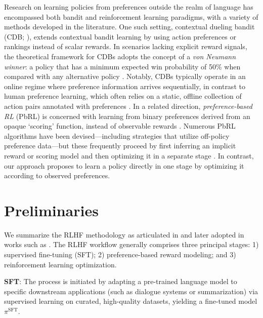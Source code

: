 Research on learning policies from preferences outside the realm of language has encompassed both bandit and reinforcement learning paradigms, with a variety of methods developed in the literature. One such setting, contextual dueling bandit (CDB; \cite{yue2012karmed,dudik2015contextual}), extends contextual bandit learning by using action preferences or rankings instead of scalar rewards. In scenarios lacking explicit reward signals, the theoretical framework for CDBs adopts the concept of a \textit{von Neumann winner}: a policy that has a minimum expected win probability of 50\% when compared with any alternative policy \citep{dudik2015contextual}. Notably, CDBs typically operate in an online regime where preference information arrives sequentially, in contrast to human preference learning, which often relies on a static, offline collection of action pairs annotated with preferences \citep{yan2022human}. In a related direction, \textit{preference-based RL} (PbRL) is concerned with learning from binary preferences derived from an opaque ‘scoring’ function, instead of observable rewards \citep{BusaFekete2014,ruiz2023dueling}. Numerous PbRL algorithms have been devised—including strategies that utilize off-policy preference data—but these frequently proceed by first inferring an implicit reward or scoring model and then optimizing it in a separate stage \citep{jain2013learning,BusaFekete2014,christiano2017deep,sadigh2017active,kupcsik2018learning}. In contrast, our approach proposes to learn a policy directly in one stage by optimizing it according to observed preferences.

\section{Preliminaries}\label{section:prelims}

We summarize the RLHF methodology as articulated in \citeauthor{ziegler2020finetuning} and later adopted in works such as \citep{stiennon2022learning, bai2022training, ouyang2022training}. The RLHF workflow generally comprises three principal stages: 1) supervised fine-tuning (SFT); 2) preference-based reward modeling; and 3) reinforcement learning optimization.

\textbf{SFT}: The process is initiated by adapting a pre-trained language model to specific downstream applications (such as dialogue systems or summarization) via supervised learning on curated, high-quality datasets, yielding a fine-tuned model $\pi^\text{SFT}$.

